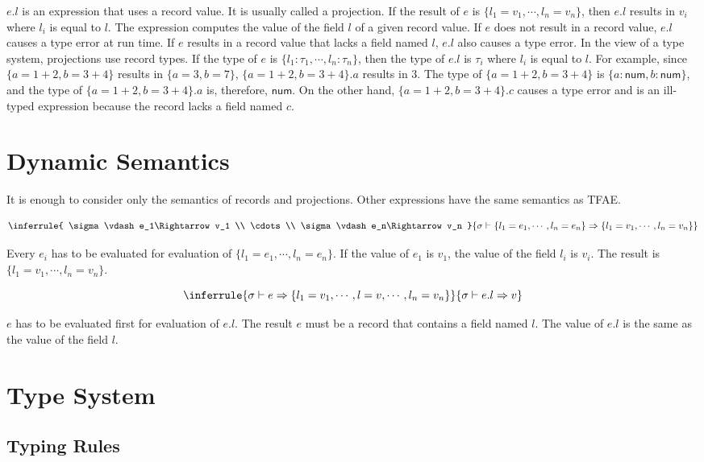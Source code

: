$e.l$ is an expression that uses a record value. It is usually called a
projection. If the result of $e$ is $\{l_1=v_1,\cdots,l_n=v_n\}$, then
$e.l$ results in $v_i$ where $l_i$ is equal to $l$. The expression
computes the value of the field $l$ of a given record value. If $e$ does not
result in a record value, $e.l$ causes a type error at run time. If $e$
results in a record value that lacks a field named $l$, $e.l$ also causes a
type error. In the view of a type system, projections use record types. If the
type of $e$ is $\{l_1:\tau_1,\cdots,l_n:\tau_n\}$, then the type of $e.l$
is $\tau_i$ where $l_i$ is equal to $l$. For example, since
$\{a=1+2,b=3+4\}$ results in $\{a=3,b=7\}$, $\{a=1+2,b=3+4\}.a$ results in
$3$. The type of $\{a=1+2,b=3+4\}$ is $\{a:\textsf{num},b:\textsf{num}\}$, and
the type of $\{a=1+2,b=3+4\}.a$ is, therefore, $\textsf{num}$. On the other hand,
$\{a=1+2,b=3+4\}.c$ causes a type error and is an ill-typed expression because
the record lacks a field named $c$.

\section{Dynamic Semantics}

It is enough to consider only the semantics of records and projections. Other
expressions have the same semantics as TFAE.

\[
\inferrule
{ \sigma\vdash e_1\Rightarrow v_1 \\ \cdots \\ \sigma\vdash e_n\Rightarrow v_n }
{ \sigma\vdash \{l_1=e_1,\cdots,l_n=e_n\}\Rightarrow\{l_1=v_1,\cdots,l_n=v_n\} }
\]

Every $e_i$ has to be evaluated for evaluation of
$\{l_1=e_1,\cdots,l_n=e_n\}$. If the value of $e_1$ is $v_1$, the value of
the field $l_i$ is $v_i$. The result is $\{l_1=v_1,\cdots,l_n=v_n\}$.

\[
\inferrule
{ \sigma\vdash e\Rightarrow\{l_1=v_1,\cdots,l=v,\cdots,l_n=v_n\} }
{ \sigma\vdash e.l\Rightarrow v }
\]

$e$ has to be evaluated first for evaluation of $e.l$. The result $e$ must
be a record that contains a field named $l$. The value of $e.l$ is the same
as the value of the field $l$.

\section{Type System}

\subsection{Typing Rules}

